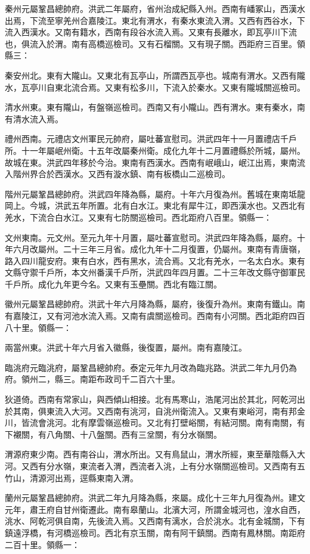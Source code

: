 秦州元屬鞏昌總帥府。洪武二年屬府，省州治成紀縣入州。西南有嶓冢山，西漢水出焉，下流至寧羌州合嘉陵江。東北有渭水，有秦水東流入渭。又西有西谷水，下流入西漢水。又南有籍水，西南有段谷水流入焉。又東有長離水，即瓦亭川下流也，俱流入於渭。南有高橋巡檢司。又有石榴關。又有現子關。西距府三百里。領縣三：

秦安州北。東有大隴山。又東北有瓦亭山，所謂西瓦亭也。城南有渭水。又西有隴水，瓦亭川自東北流合焉。又東有松多川，下流入於秦水。又東有隴城關巡檢司。

清水州東。東有隴山，有盤嶺巡檢司。西南又有小隴山。西有渭水。東有秦水，南有清水流入焉。

禮州西南。元禮店文州軍民元帥府，屬吐蕃宣慰司。洪武四年十一月置禮店千戶所。十一年屬岷州衛。十五年改屬秦州衛。成化九年十二月置禮縣於所城，屬州。故城在東。洪武四年移於今治。東南有西漢水。西南有岷峨山，岷江出焉，東南流入階州界合於西漢水。又西有漩水鎮、南有板橋山二巡檢司。

階州元屬鞏昌總帥府。洪武四年降為縣，屬府。十年六月復為州。舊城在東南坻龍岡上。今城，洪武五年所置。北有白水江。東北有犀牛江，即西漢水也。又西北有羌水，下流合白水江。又東有七防關巡檢司。西北距府八百里。領縣一：

文州東南。元文州。至元九年十月置，屬吐蕃宣慰司。洪武四年降為縣，屬府。十年六月改屬州。二十三年三月省。成化九年十二月復置，仍屬州。東南有青唐嶺，路入四川龍安府。東有白水，西有黑水，流合焉。又北有羌水，一名太白水。東有文縣守禦千戶所，本文州番漢千戶所，洪武四年四月置。二十三年改文縣守御軍民千戶所。成化九年更今名。又東有玉壘關。西北有臨江關。

徽州元屬鞏昌總帥府。洪武十年六月降為縣，屬府，後復升為州。東南有鐵山。南有嘉陵江，又有河池水流入焉。又南有虞關巡檢司。西南有小河關。西北距府四百八十里。領縣一：

兩當州東。洪武十年六月省入徽縣，後復置，屬州。南有嘉陵江。

臨洮府元臨洮府，屬鞏昌總帥府。泰定元年九月改為臨兆路。洪武二年九月仍為府。領州二，縣三。南距布政司千二百六十里。

狄道倚。西南有常家山，與西傾山相接。北有馬寒山，浩尾河出於其北，阿乾河出於其南，俱東流入大河。又西南有洮河，自洮州衛流入。又東有東峪河，南有邦金川，皆流會洮河。北有摩雲嶺巡檢司。又北有打壁峪關，有結河關。南有南關，有下襯關，有八角關、十八盤關。西有三坌關，有分水嶺關。

渭源府東少南。西有南谷山，渭水所出。又有鳥鼠山，渭水所經，東至華陰縣入大河。又西有分水嶺，東流者入渭，西流者入洮，上有分水嶺關巡檢司。又西南有五竹山，清源河出焉，逕縣東南入渭。

蘭州元屬鞏昌總帥府。洪武二年九月降為縣，來屬。成化十三年九月復為州。建文元年，肅王府自甘州衛遷此。南有皋蘭山。北濱大河，所謂金城河也，湟水自西，洮水、阿乾河俱自南，先後流入焉。又西南有漓水，合於洮水。北有金城關，下有鎮遠浮橋，有河橋巡檢司。西北有京玉關，南有阿干鎮關。西南有鳳林關。南距府二百十里。領縣一：

